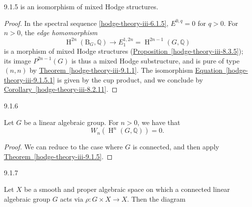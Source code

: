 \begin{theorem}{9.1.5}
    is an isomorphism of mixed Hodge structures.\begin{proof}\par{}In the spectral sequence \cref{hodge-theory-iii-6.1.5}, \(E^{0,q}=0\) for \(q>0\).
      For \(n>0\), the \emph{edge homomorphism}
      \[         \operatorname {H}^{2n}(\mathrm {B}_G,\mathbb {Q})         \to  E_1^{1,2n}         = \operatorname {H}^{2n-1}(G,\mathbb {Q})       \]
      is a morphism of mixed Hodge structures (\hyperref[hodge-theory-iii-8.3.5]{Proposition~\ref*{hodge-theory-iii-8.3.5}});
      its image \(P^{2n-1}(G)\) is thus a mixed Hodge substructure, and is pure of type \((n,n)\) by \hyperref[hodge-theory-iii-9.1.1]{Theorem~\ref*{hodge-theory-iii-9.1.1}}.
      The isomorphism \hyperref[hodge-theory-iii-9.1.5.1]{Equation~\ref*{hodge-theory-iii-9.1.5.1}} is given by the cup product, and we conclude by \hyperref[hodge-theory-iii-8.2.11]{Corollary~\ref*{hodge-theory-iii-8.2.11}}.\end{proof}\end{theorem}\begin{corollary}{9.1.6}\label{hodge-theory-iii-9.1.6}\skipsinglepar\par{}Let \(G\) be a linear algebraic group.
    For \(n>0\), we have that
    \[       W_n(\operatorname {H}^n(G,\mathbb {Q}))       = 0.     \]\begin{proof}\par{}We can reduce to the case where \(G\) is connected, and then apply \hyperref[hodge-theory-iii-9.1.5]{Theorem~\ref*{hodge-theory-iii-9.1.5}}.\end{proof}\end{corollary}\begin{theorem}{9.1.7}\label{hodge-theory-iii-9.1.7}\skipsinglepar\par{}Let \(X\) be a smooth and proper algebraic space on which a connected linear algebraic group \(G\) acts via \(\rho \colon  G\times  X\to  X\).
    Then the diagram
    


\end{theorem}
